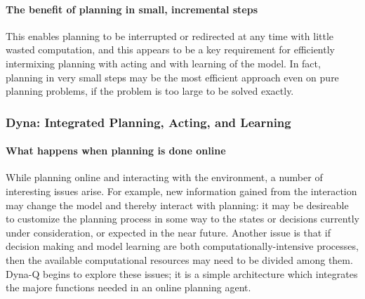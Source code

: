 \documentclass[12pt]{article}
\begin{document}
\paragraph{The benefit of planning in small, incremental steps} This enables planning to be interrupted or redirected at any time with little wasted computation, and this appears to be a key requirement for efficiently intermixing planning with acting and with learning of the model. In fact, planning in very small steps may be the most efficient approach even on pure planning problems, if the problem is too large to be solved exactly.

\subsubsection{Dyna: Integrated Planning, Acting, and Learning}
\paragraph{What happens when planning is done online} While planning online and interacting with the environment, a number of interesting issues arise. For example, new information gained from the interaction may change the model and thereby interact with planning: it may be desireable to customize the planning process in some way to the states or decisions currently under consideration, or expected in the near future. Another issue is that if decision making and model learning are both computationally-intensive processes, then the available computational resources may need to be divided among them. Dyna-Q begins to explore these issues; it is a simple architecture which integrates the majore functions needed in an online planning agent.
\end{document}
